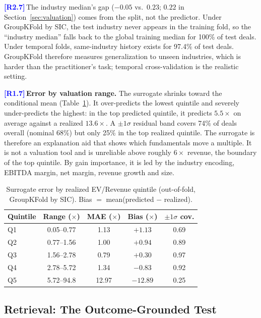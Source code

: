 \documentclass[conference]{IEEEtran}
\newcommand{\rc}[1]{\textcolor{blue}{\textbf{[#1]}}\,}
\newcommand{\rc}[1]{}
\begin{document}
\rc{R2.7}The industry median's gap ($-0.05$ vs.\ $0.23$; $0.22$ in Section~\ref{sec:valuation}) comes from the split, not the predictor. Under GroupKFold by SIC, the test industry never appears in the training fold, so the ``industry median'' falls back to the global training median for 100\% of test deals. Under temporal folds, same-industry history exists for 97.4\% of test deals. GroupKFold therefore measures generalization to unseen industries, which is harder than the practitioner's task; temporal cross-validation is the realistic setting.

\rc{R1.7}\noindent\textbf{Error by valuation range.}
The surrogate shrinks toward the conditional mean (Table~\ref{tab:surrogate_err}). It over-predicts the lowest quintile and severely under-predicts the highest: in the top predicted quintile, it predicts $5.5\times$ on average against a realized $13.6\times$. A $\pm1\sigma$ residual band covers 74\% of deals overall (nominal 68\%) but only 25\% in the top realized quintile. The surrogate is therefore an explanation aid that shows which fundamentals move a multiple. It is not a valuation tool and is unreliable above roughly $6\times$ revenue, the boundary of the top quintile. By gain importance, it is led by the industry encoding, EBITDA margin, net margin, revenue growth and size.

\begin{table}[t]
\centering
\caption{Surrogate error by realized EV/Revenue quintile (out-of-fold, GroupKFold by SIC). Bias $=$ mean(predicted $-$ realized).}
\label{tab:surrogate_err}
\footnotesize
\setlength{\tabcolsep}{4pt}
\begin{tabular}{lcccc}
\toprule
Quintile & Range ($\times$) & MAE ($\times$) & Bias ($\times$) & $\pm1\sigma$ cov. \\
\midrule
Q1 & 0.05--0.77 & 1.13 & $+1.13$ & 0.69 \\
Q2 & 0.77--1.56 & 1.00 & $+0.94$ & 0.89 \\
Q3 & 1.56--2.78 & 0.79 & $+0.30$ & 0.97 \\
Q4 & 2.78--5.72 & 1.34 & $-0.83$ & 0.92 \\
Q5 & 5.72--94.8 & 12.97 & $-12.89$ & 0.25 \\
\bottomrule
\end{tabular}
\end{table}

\subsection{Retrieval: The Outcome-Grounded Test}
\end{document}
